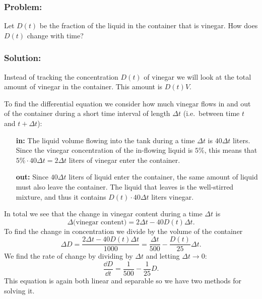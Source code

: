 



\subsubsection*{Problem:} Let $D(t)$ be the fraction of the liquid in the container
that is vinegar.  How does $D(t)$ change with time?

\subsubsection*{Solution:} Instead of tracking the concentration $D(t)$ of vinegar we
will look at the total amount of vinegar in the container.  This amount is $D(t)V$.

To find the differential equation we consider how much vinegar flows in and out of
the container during a short time interval of length $\Delta t$ (i.e.~between time
$t$ and $t+\Delta t$):
\begin{itemize}
\item [\textbf{in:}] The liquid volume flowing into the tank during a time $\Delta t$
  is $40\Delta t$ liters.  Since the vinegar concentration of the in-flowing liquid
  is $5$\%, this means that $5\%\cdot40\Delta t = 2\Delta t$ liters of vinegar
  enter the container.
\item [\textbf{out:}] Since $40\Delta t$ liters of liquid enter the container, the
  same amount of liquid must also leave the container.  The liquid that leaves is the
  well-stirred mixture, and thus it contains $D(t)\cdot40\Delta t $ liters vinegar.
\end{itemize}
In total we see that the change in vinegar content during a time $\Delta t$ is
\begin{equation}
\Delta\bigl(\text{vinegar content}\bigr) =
2 \Delta t - 40 D(t) \Delta t.
\label{eq:change-in-vinegar-content}
\end{equation}
To find the change in concentration we divide by the volume of the container
\[
\Delta D = \frac{2 \Delta t - 40 D(t) \Delta t} {1000} =
\frac{\Delta t} {500} - \frac{D(t)} {25} \Delta t.
\]
We find the rate of change by dividing by $\Delta t$ and letting $\Delta t\to0$:
\begin{equation}
  \frac{\dd D} {\dd t} = \frac{1} {500} - \frac{1} {25} D.
  \label{eq:diffeq-mixing-vinegar}
\end{equation}
This equation is again both linear and separable so we have two methods for solving
it.

